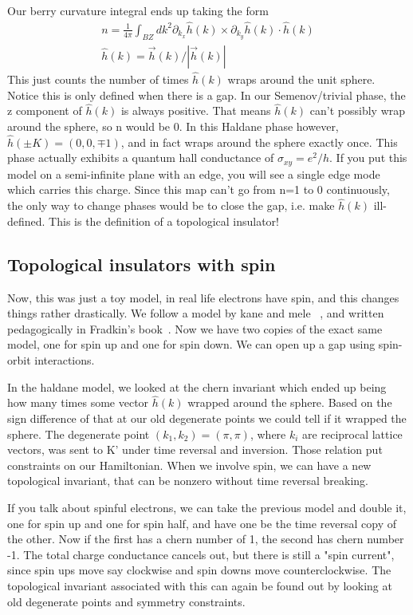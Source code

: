 Our berry curvature integral ends up taking the form
\begin{align}
n = \frac{1}{4\pi}\int_{BZ}dk^2 \partial_{k_x}\hat{h}(k) \times \partial_{k_y}\hat{h}(k) \cdot \hat{h}(k) \\
\hat{h}(k) = \vec{h}(k)/|\vec{h}(k)|
\end{align} 
This just counts the number of times $\hat{h}(k)$ wraps around the unit sphere. Notice this is only defined when there is a gap. In our Semenov/trivial phase, the z component of $\hat{h}(k)$ is always positive. That means $\hat{h}(k)$ can't possibly wrap around the sphere, so n would be 0. In this Haldane phase however, $\hat{h}(\pm K) = (0,0,\mp 1)$, and in fact wraps around the sphere exactly once. This phase actually exhibits a quantum hall conductance of $\sigma_{xy}=e^2/h$. If you put this model on a semi-infinite plane with an edge, you will see a single edge mode which carries this charge. Since this map can't go from n=1 to 0 continuously, the only way to change phases would be to close the gap, i.e. make $\hat{h}(k)$ ill-defined. This is the definition of a topological insulator! 

\subsection{Topological insulators with spin}

Now, this was just a toy model, in real life electrons have spin, and this changes things rather drastically. We follow a model by kane and mele ~\cite{KaneMele}, and written pedagogically in Fradkin's book~\cite{Fradkinbook}. Now we have two copies of the exact same model, one for spin up and one for spin down. We can open up a gap using spin-orbit interactions.

In the haldane model, we looked at the chern invariant which ended up being how many times some vector $\hat{h}(k)$ wrapped around the sphere. Based on the sign difference of that at our old degenerate points we could tell if it wrapped the sphere. The degenerate point $(k_1,k_2)=(\pi,\pi)$, where $k_i$ are reciprocal lattice vectors, was sent to K' under time reversal and inversion. Those relation put constraints on our Hamiltonian. When we involve spin, we can have a new topological invariant, that can be nonzero without time reversal breaking. 

If you talk about spinful electrons, we can take the previous model and double it, one for spin up and one for spin half, and have one be the time reversal copy of the other. Now if the first has a chern number of 1, the second has chern number -1. The total charge conductance cancels out, but there is still a "spin current", since spin ups move say clockwise and spin downs move counterclockwise. The topological invariant associated with this can again be found out by looking at old degenerate points and symmetry constraints.

